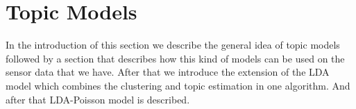 \documentclass[a4paper,fleqn]{article}
\begin{document}
% 

\pagebreak

\section{Topic Models}
\label{sec:TopicModels}
In the introduction of this section we describe the general idea of topic models followed by a section that describes how this kind of models can be used on the sensor data that we have. After that we introduce the extension of the LDA model which combines the clustering and topic estimation in one algorithm. And after that LDA-Poisson model is described.
\end{document}
